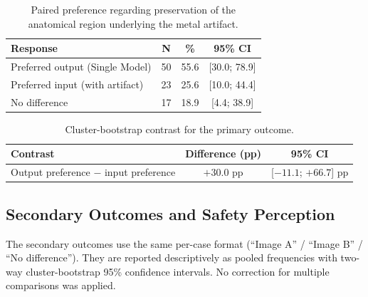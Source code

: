 \begin{table}[htbp]
\centering
\small
\begin{tabular}{lccc}
\toprule
\textbf{Response} & \textbf{N} & \textbf{\%} & \textbf{95\% CI} \\
\midrule
Preferred output (Single Model) & 50 & 55.6 & [30.0; 78.9] \\
Preferred input (with artifact) & 23 & 25.6 & [10.0; 44.4] \\
No difference & 17 & 18.9 & [4.4; 38.9] \\
\bottomrule
\end{tabular}
\captionsetup{skip=2pt}
\caption[Primary outcome: anatomical preservation preference]{Paired preference regarding preservation of the anatomical region underlying the metal artifact.}
\label{tab:external-primary-outcome}
\end{table}

\begin{table}[htbp]
\centering
\small
\begin{tabular}{lcc}
\toprule
\textbf{Contrast} & \textbf{Difference (pp)} & \textbf{95\% CI} \\
\midrule
Output preference $-$ input preference & $+30.0$ pp & [$-11.1$; $+66.7$] pp \\
\bottomrule
\end{tabular}
\captionsetup{skip=2pt}
\caption[Primary outcome: output--input contrast]{Cluster-bootstrap contrast for the primary outcome.}
\label{tab:external-primary-model}
\end{table}
\FloatBarrier

\subsection{Secondary Outcomes and Safety Perception}

The secondary outcomes use the same per-case format (``Image A'' / ``Image B'' / ``No difference''). They are reported descriptively as pooled frequencies with two-way cluster-bootstrap 95\% confidence intervals. No correction for multiple comparisons was applied.

